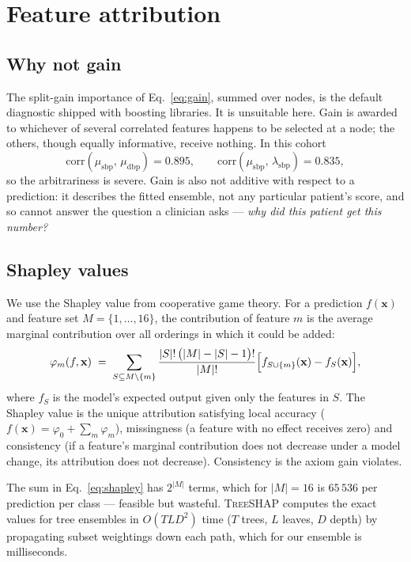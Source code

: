 \documentclass[11pt,a4paper]{article}
\newcommand{\sbp}{\mathrm{sbp}}
\newcommand{\dbp}{\mathrm{dbp}}
\begin{document}
\section{Feature attribution}
\label{sec:shap}

\subsection{Why not gain}

The split-gain importance of Eq.~\eqref{eq:gain}, summed over nodes, is the default
diagnostic shipped with boosting libraries. It is unsuitable here. Gain is awarded
to whichever of several correlated features happens to be selected at a node; the
others, though equally informative, receive nothing. In this cohort
\[
  \mathrm{corr}(\mu_{\sbp},\,\mu_{\dbp}) = 0.895,
  \qquad
  \mathrm{corr}(\mu_{\sbp},\,\lambda_{\sbp}) = 0.835,
\]
so the arbitrariness is severe. Gain is also not additive with respect to a
prediction: it describes the fitted ensemble, not any particular patient's score,
and so cannot answer the question a clinician asks --- \emph{why did this patient
get this number?}

\subsection{Shapley values}

We use the Shapley value from cooperative game theory. For a prediction
$f(\mathbf{x})$ and feature set $M = \{1,\dots,16\}$, the contribution of feature
$m$ is the average marginal contribution over all orderings in which it could be
added:
\begin{equation}
\label{eq:shapley}
  \varphi_m(f,\mathbf{x}) \;=\;
  \sum_{S \subseteq M\setminus\{m\}}
  \frac{|S|!\,\bigl(|M|-|S|-1\bigr)!}{|M|!}
  \Bigl[ f_{S\cup\{m\}}(\mathbf{x}) - f_{S}(\mathbf{x}) \Bigr],
\end{equation}
where $f_S$ is the model's expected output given only the features in $S$. The
Shapley value is the unique attribution satisfying local accuracy
($f(\mathbf{x}) = \varphi_0 + \sum_m \varphi_m$), missingness (a feature with no
effect receives zero) and consistency (if a feature's marginal contribution does
not decrease under a model change, its attribution does not decrease).
Consistency is the axiom gain violates.

The sum in Eq.~\eqref{eq:shapley} has $2^{|M|}$ terms, which for $|M|=16$ is
$65\,536$ per prediction per class --- feasible but wasteful. \textsc{TreeSHAP}
\cite{lundberg2020} computes the exact values for tree ensembles in
$O(T L D^2)$ time ($T$ trees, $L$ leaves, $D$ depth) by propagating subset
weightings down each path, which for our ensemble is milliseconds.
\end{document}
